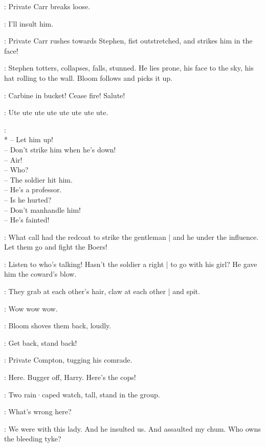 :
Private Carr breaks loose.

\Carr:
I'll insult him.

:
Private Carr rushes towards Stephen,
fist outstretched,
and strikes him in the face!

:
Stephen totters,
collapses,
falls,
stunned.
He lies prone,
his face to the sky,
his hat rolling to the wall.
Bloom follows and picks it up.%

\MajorTweedy[7a]:
Carbine in bucket!
Cease fire!
Salute!

\Retriever:
Ute ute ute ute ute ute ute ute.

\Crowd[7b]:\\*
-- Let him up!\\
-- Don't strike him when he's down!\\
-- Air!\\
-- Who?\\
-- The soldier hit him.\\
-- He's a professor.\\
-- Is he hurted?\\
-- Don't manhandle him!\\
-- He's fainted!

\Hag[7a]:
What call had the redcoat to strike the gentleman |
and he under the influence.
%
Let them go and fight the Boers!

\Bawd[7b]:
Listen to who's talking!
Hasn't the soldier a right |
to go with his girl?
He gave him the coward's blow.

:
They grab at each other's hair,
claw at each other |
and spit.

\Retriever:
Wow wow wow.

:
Bloom shoves them back,
loudly.

\Bloom:
Get back,
stand back!

:
Private Compton,
tugging his comrade.

\Compton:
Here.
Bugger off,
Harry.
Here's the cops!


:
Two rain·caped watch,
tall,
stand in the group.

\FirstWatch[8a]:
What's wrong here?

\Compton:
We were with this lady.
And he insulted us.
And assaulted my chum.
Who owns the bleeding tyke?

